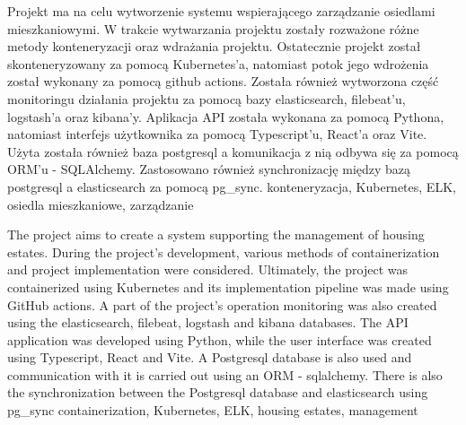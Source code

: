 \clearpage %
\streszczenie Projekt ma na celu wytworzenie systemu wspierającego zarządzanie osiedlami mieszkaniowymi. W trakcie wytwarzania projektu zostały rozważone różne metody konteneryzacji oraz wdrażania projektu. Ostatecznie projekt został skonteneryzowany za pomocą Kubernetes'a, natomiast potok jego wdrożenia został wykonany za pomocą github actions. Została również wytworzona część monitoringu działania projektu za pomocą bazy elasticsearch, filebeat'u, logstash'a oraz kibana'y. Aplikacja API została wykonana za pomocą Pythona, natomiast interfejs użytkownika za pomocą Typescript'u, React'a oraz Vite. Użyta została również baza postgresql a komunikacja z nią odbywa się za pomocą ORM'u - SQLAlchemy. Zastosowano  również synchronizację między bazą postgresql a elasticsearch za pomocą pg\_sync.
\slowakluczowe konteneryzacja, Kubernetes, ELK, osiedla mieszkaniowe, zarządzanie

\newpage
\abstract The project aims to create a system supporting the management of housing estates. During the project's development, various methods of containerization and project implementation were considered. Ultimately, the project was containerized using Kubernetes and its implementation pipeline was made using GitHub actions. A part of the project's operation monitoring was also created using the elasticsearch, filebeat, logstash and kibana databases. The API application was developed using Python, while the user interface was created using Typescript, React and Vite. A Postgresql database is also used and communication with it is carried out using an ORM - sqlalchemy. There is also the synchronization between the Postgresql database and elasticsearch using pg\_sync
\keywords containerization, Kubernetes, ELK, housing estates, management